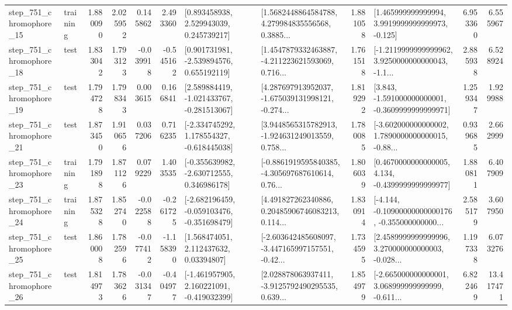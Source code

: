 \begin{tabular}{llrrrrllrlrr}
  step\_751\_chromophore\_15 &  training &      1.880090 &    2.025952 &      0.145862 &  2.493360 &     [0.893458938, 2.529943039, 0.245739217] &  [1.5682448864584788, 4.279984835556568, 0.3885... &       1.881058 &    [1.465999999999994, 3.9919999999999973, -0.125] &            6.953360 &          6.555967 \\
  step\_751\_chromophore\_18 &      test &      1.833042 &    1.793123 &     -0.039918 & -0.545162 &    [0.901731981, -2.539894576, 0.655192119] &  [1.4547879332463887, -4.211223621593069, 0.716... &       1.761518 &  [-1.2119999999999962, 3.9250000000000043, -1.1... &            2.885938 &          6.528924 \\
  step\_751\_chromophore\_19 &      test &      1.794728 &    1.798343 &      0.003615 &  0.166841 &   [2.589884419, -1.021433767, -0.281513067] &  [4.287697913952037, -1.675039131998121, -0.274... &       1.819292 &   [3.843, -1.591000000000001, -0.3609999999999971] &            1.259347 &          1.929988 \\
  step\_751\_chromophore\_21 &      test &      1.873450 &    1.910656 &      0.037206 &  0.716235 &   [-2.334745292, 1.178554327, -0.618445038] &  [3.9448565315782913, -1.924631249013559, 0.758... &       1.780085 &  [-3.602000000000002, 1.7890000000000015, -0.88... &            0.939685 &          2.662999 \\
  step\_751\_chromophore\_23 &  training &      1.791898 &    1.871126 &      0.079229 &  1.403535 &   [-0.355639982, -2.630712555, 0.346986178] &  [-0.8861919595840385, -4.305697687610614, 0.76... &       1.806039 &   [0.4670000000000005, 4.134, -0.4399999999999977] &            1.880811 &          6.407909 \\
  step\_751\_chromophore\_24 &  training &      1.875328 &    1.852740 &     -0.022588 & -0.261725 &  [-2.682196459, -0.059103476, -0.351698479] &  [4.491827262340886, 0.20485906746083213, 0.114... &       1.830914 &  [-4.144, -0.10900000000000176, -0.355000000000... &            2.585179 &          3.607950 \\
  step\_751\_chromophore\_25 &      test &      1.860008 &    1.782596 &     -0.077412 & -1.158390 &      [1.568474051, 2.112437632, 0.03394807] &  [-2.603642485608097, -3.447165997157551, -0.42... &       1.734595 &  [2.4589999999999996, 3.270000000000003, -0.028... &            1.197338 &          6.073276 \\
  step\_751\_chromophore\_26 &      test &      1.814973 &    1.783626 &     -0.031347 & -0.404977 &   [-1.461957905, 2.160221091, -0.419032399] &  [2.028878063937411, -3.9125792490295535, 0.639... &       1.854979 &  [-2.665000000000001, 3.068999999999999, -0.611... &            6.822469 &         13.417471 \\

\end{tabular}
